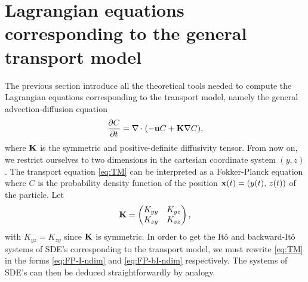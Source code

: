 \section{Lagrangian equations corresponding to the general transport model}
The previous section introduce all the theoretical tools needed to compute the Lagrangian equations corresponding to the transport model, namely the general advection-diffusion equation
\begin{equation} \label{eq:TM}
	\frac{\partial C}{\partial t} = \nabla \cdot (-\mathbf u C + \mathbf K \nabla C),
\end{equation}
where $\mathbf K$ is the symmetric and positive-definite diffusivity tensor.
From now on, we restrict ourselves to two dimensions in the cartesian coordinate system $(y,z)$. 
The transport equation \eqref{eq:TM} can be interpreted as a Fokker-Planck equation where $C$ is the probability density function of the position $\mathbf x(t) = (y(t),\,z(t))$ of the particle. Let
\begin{equation}
	\mathbf K = \begin{pmatrix} K_{yy} & K_{yz}\\ K_{zy} & K_{zz} \end{pmatrix},
\end{equation}
with $K_{yz} = K_{zy}$ since $\mathbf K$ is symmetric. In order to get the Itô and backward-Itô systems of SDE's corresponding to the transport model, we must rewrite \eqref{eq:TM} in the forms \eqref{eq:FP-I-ndim} and \eqref{eq:FP-bI-ndim} respectively. The systems of SDE's can then be deduced straightforwardly by analogy.


